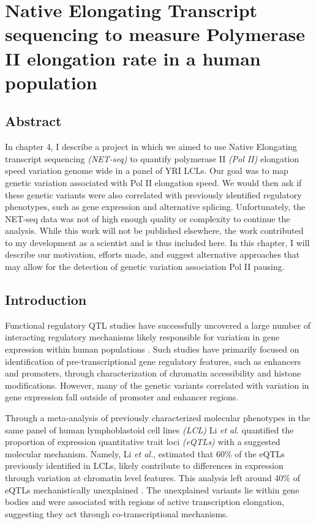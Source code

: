 \chapter{Native Elongating Transcript sequencing to measure Polymerase II elongation rate in a human population}\label{ch:netseq}

\section{Abstract}\label{ch04-abstract}


In chapter 4, I describe a project in which we aimed to use Native Elongating transcript sequencing \emph{(NET-seq)} to quantify polymerase II \emph{(Pol II)} elongation speed variation genome wide in a panel of YRI LCLs. Our goal was to map genetic variation associated with Pol II elongation speed. We would then ask if these genetic variants were also correlated with previously identified regulatory phenotypes, such as gene expression and alternative splicing. Unfortunately, the NET-seq data was not of high enough quality or complexity to continue the analysis. While this work will not be published elsewhere, the work contributed to my development as a scientist and is thus included here. In this chapter, I will describe our motivation, efforts made, and suggest alternative approaches that may allow for the detection of genetic variation association Pol II pausing.  



\clearpage

\section{Introduction}\label{ch04-introduction}

Functional regulatory QTL studies have successfully uncovered a large number of interacting regulatory mechanisms likely responsible for variation in gene expression within human populations \citep{li_rna_2016, McVicker2013, degner_dnase_2012, gaffney_dissecting_2012, battle_genomic_2015}. Such studies have primarily focused on identification of pre-transcriptional gene regulatory features, such as enhancers and promoters, through characterization of chromatin accessibility and histone modifications. However, many of the genetic variants correlated with variation in gene expression fall outside of promoter and enhancer regions.  


Through a meta-analysis of previously characterized molecular phenotypes in the same panel of human lymphoblastoid cell lines \emph{(LCL)} Li \emph{et al.} quantified the proportion of expression quantitative trait loci \emph{(eQTLs)} with a suggested molecular mechanism. Namely, Li \emph{et al.}, estimated that 60\% of the eQTLs previously identified in LCLs, likely contribute to differences in expression through variation at chromatin level features. This analysis left around 40\% of eQTLs mechanistically unexplained \citep{li_rna_2016}. The unexplained variants lie within gene bodies and were associated with regions of active transcription elongation, suggesting they act through co-transcriptional mechanisms. 

